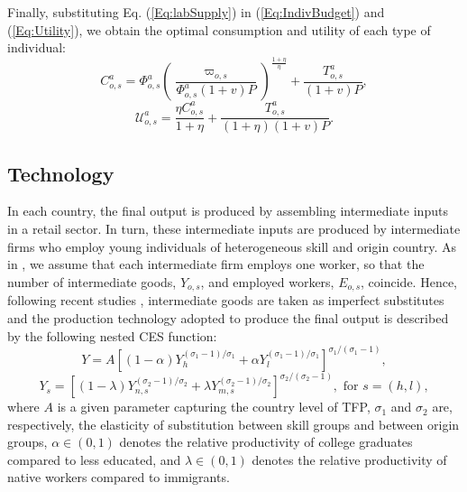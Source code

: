 \documentclass[a4paper,12pt]{article}
\begin{document}
Finally, substituting Eq. (\ref{Eq:labSupply}) in (\ref{Eq:IndivBudget}) and
(\ref{Eq:Utility}), we obtain the optimal consumption and utility of each
type of individual: 
\begin{equation}
C_{o,s}^{a}=\Phi _{o,s}^{a}\left( \frac{\varpi _{o,s}}{\Phi _{o,s}^{a}(1+v)P}%
\right) ^{\frac{1+\eta }{\eta }}+\frac{T_{o,s}^{a}}{(1+v)P},
\label{Eq:OptCons}
\end{equation}
\begin{equation}
\mathcal{U}_{o,s}^{a}=\frac{\eta C_{o,s}^{a}}{1+\eta }+\frac{T_{o,s}^{a}}{(1+\eta )(1+v)P}.  \label{Eq:OptU}
\end{equation}

\subsection{Technology} \label{technology}

In each country, the final output is produced by assembling intermediate
inputs in a retail sector. In turn, these intermediate inputs are produced
by intermediate firms who employ young individuals of heterogeneous skill
and origin country. As in \citet{Acemoglu2001}, we assume that each intermediate firm employs one worker, so that the number of intermediate goods, $Y_{o,s}$, and employed workers, $E_{o,s}$, coincide. Hence, following recent studies \citep[such as][]{Manacorda2012,Ottaviano2012}, intermediate goods are taken as imperfect substitutes and the production
technology adopted to produce the final output is described by the
following nested CES function: 
\begin{equation}
Y=A\left[ (1-\alpha )Y_{h}^{(\sigma _{1}-1)/\sigma _{1}}+\alpha
Y_{l}^{(\sigma _{1}-1)/\sigma _{1}}\right] ^{\sigma _{1}/\left(\sigma _{1}-1\right)},
\label{Eq:ProdFunction}
\end{equation}%
\begin{equation*}
Y_{s}=\left[ (1-\lambda )Y_{n,s}^{(\sigma _{2}-1)/\sigma _{2}}+\lambda
Y_{m,s}^{(\sigma _{2}-1)/\sigma _{2}}\right] ^{\sigma _{2}/(\sigma _{2}-1)},%
\text{ for $s=(h,l)$},
\end{equation*}%
where $A$ is a given parameter capturing the country level of TFP, $\sigma
_{1}$ and $\sigma _{2}$ are, respectively, the elasticity of substitution
between skill groups and between origin groups, $\alpha \in (0,1)$ denotes
the relative productivity of college graduates compared to less educated,
and $\lambda \in (0,1)$ denotes the relative productivity of native workers
compared to immigrants.
\end{document}
